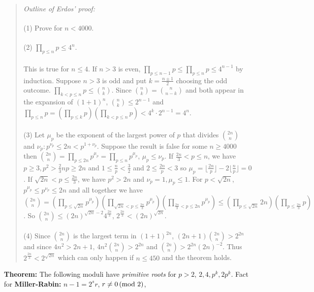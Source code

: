 \begin{quote}
\emph{
Outline of Erdos' proof:} \\
\\
(1) Prove for $n<4000$.
\\
\\
(2) $\prod_{p \leq n} p \leq 4^{n}$.\\
\\
This is true for $n\le 4$.  If $n>3$ is even,
$\prod_{p \leq n-1} p \leq \prod_{p \leq n} p \leq 4^{n-1}$ by induction.  Suppose
$n>3$ is odd and put $k= {\frac {n \pm 1} 2}$ choosing the odd outcome.
$\prod_{k < p \leq n} p \leq {n \choose k}$.  Since 
${n \choose k}= {n \choose {n-k}}$ and both appear in the expansion of $(1+1)^n$, 
${n \choose k} \leq 2^{n-1}$ and
$\prod_{p \leq n} p = (\prod_{p \leq k} p ) (\prod_{k < p \leq n} p ) < 4^k \cdot 2^{n-1}=4^n$.
\\
\\
(3) 
Let $\mu_p$ be the exponent of the largest power of $p$ that divides
${{2n} \choose {n}}$ and $\nu_p: p^{\nu_p} \leq 2n < p^{1+\nu_p}$.
Suppose the result is false for some $n \geq 4000$ then
${{2n} \choose {n}}=
\prod_{p \leq 2n} p^{\mu_p} = \prod_{p \leq n} p^{\mu_p}$,
$\mu_p \leq \nu_p$.
If ${\frac {2n} 3} < p \leq n$, we have $p \geq 3, p^2 > {\frac 2 3} np \geq 2n$ and
$1 \leq {\frac n p} < {\frac 3 2}$ and $2 \leq {\frac {2n} p} <3$ so
$\mu_p= \lfloor {\frac {2n} {p}} \rfloor - 2 \lfloor {\frac {n} {p}} \rfloor = 0$.
If ${\sqrt {2n}} < p \leq {\frac {2n} 3}$, we have 
$p^2 > 2n$ and $\nu_p=1, \mu_p \leq 1$.
For $p < {\sqrt {2n}}$, $p^{\mu_p} \leq p^{\nu_p} \leq 2n$ and all together we have
${{2n} \choose {n}}=
(\prod_{p \leq {\sqrt {2n}}} p^{\mu_p})
(\prod_{{\sqrt {2n}}< p \leq {\frac {2n} 3}} p^{\mu_p})
(\prod_{{\frac {2n} 3} < p \leq 2n} p^{\mu_p}) \leq
(\prod_{p \leq {\sqrt {2n}}} 2n)
(\prod_{p \leq {\frac {2n} 3}} p)$.  
So ${{2n} \choose {n}} \leq (2n)^{{\sqrt {2n}}-2} 4^{{\frac {2n} 3}}$,
$2^{\frac {2n} 3} < (2n)^{\sqrt {2n}}$.
\\
\\
(4)  Since ${2n \choose n}$ is the largest term in $(1+1)^{2n}$,
$(2n+1){2n \choose n} > 2^{2n}$ and since $4n^2>2n+1$,
$4n^2 {2n \choose n} > 2^{2n}$ and
${2n \choose n} > 2^{2n} (2n)^{-2}$.  Thus
$2^{\frac {2n} 3} < 2^{\sqrt {2n}}$ which can only happen if 
$n \leq 450$ and the theorem holds.
\end{quote}
{\bf Theorem:}
The following moduli have \emph{primitive roots} for $p>2$, $2,4, p^k , 2p^k$.
Fact for {\bf Miller-Rabin:} $n-1= 2^s r$, $r \ne 0 \thinspace \textnormal{(mod } 2 \textnormal{)}$,
